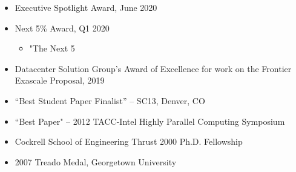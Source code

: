 \vspace{-0.3in}

\begin{itemize}
	\itemsep 0pt
	\item Executive Spotlight Award, June 2020
	\item Next 5\% Award, Q1 2020
	\begin{itemize}
	\item "The Next 5%
	\end{itemize}
	\item Datacenter Solution Group’s Award of Excellence for work on the Frontier Exascale Proposal, 2019 
        \item ``Best Student Paper Finalist'' -- SC13, Denver, CO
	\item ``Best Paper" -- 2012 TACC-Intel Highly Parallel Computing
	      Symposium 
        \item Cockrell School of Engineering Thrust 2000 Ph.D. Fellowship
        \item 2007 Treado Medal, Georgetown University      
\end{itemize}

